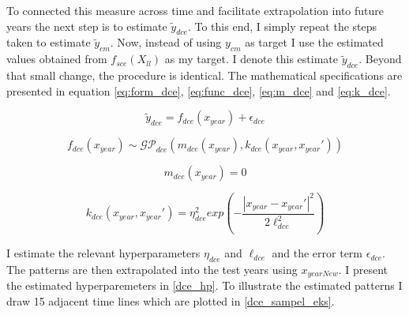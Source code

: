 \documentclass[a4paper]{article}
\begin{document}
To connected this measure across time and facilitate extrapolation into future years the next step is to estimate $\tilde{y}_{dce}$. To this end, I simply repeat the steps taken to estimate $\tilde{y}_{cm}$. Now, instead of using $y_{cm}$ as target I use the estimated values obtained from $f_{sce}(X_{ll})$ as my target. I denote this estimate $\tilde{y}_{dce}$. Beyond that small change, the procedure is identical. The mathematical specifications are presented in equation \ref{eq:form_dce}, \ref{eq:func_dce}, \ref{eq:m_dce} and \ref{eq:k_dce}.\par


\[
\tilde{y}_{dce} = f_{dce}(x_{year}) + \epsilon_{dce} \tag{27} \label{eq:form_dce}
\]

\[
f_{dce}(x_{year}) \sim \mathcal{GP}_{dce}(m_{dce}(x_{year}),k_{dce}(x_{year},x_{year}')) \tag{28} \label{eq:func_dce}
\]

\[
m_{dce}(x_{year}) = 0 \tag{21} \label{eq:m_dce}
\]

\[
k_{dce}(x_{year},x_{year}') = \eta_{dce}^2 exp\left(-\frac{|x_{year}-x_{year}'|^2}{2\ell_{dce}^2}\right) \tag{29} \label{eq:k_dce}
\]

I estimate the relevant hyperparameters $\eta_{dce}$ and $\ell_{dce}$ and the error term $\epsilon_{dce}$. The patterns are then extrapolated into the test years using $x_{yearNew}$. I present the estimated hyperparemeters in \autoref{dce_hp}. To illustrate the estimated patterns I draw 15 adjacent time lines which are plotted in \autoref{dce_sampel_eks}.\par 
\end{document}
